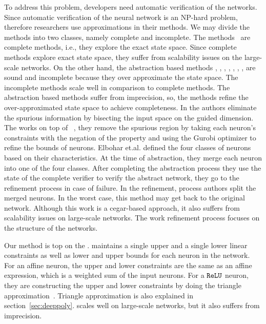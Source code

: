 To address this problem, developers need automatic verification of the networks.
Since automatic verification of the neural network is an NP-hard problem, therefore researchers use approximations in their methods. We may divide the methods into two classes, namely complete and incomplete. The methods~\cite{lomuscio2017approach,fischetti2018deep,dutta2018output,cheng2017maximum,katz2017reluplex,katz2019marabou,ehlers2017formal,huang2017safety,wang2021beta,xu2020fast,zhang2022general} are complete methods, i.e., they explore the exact state space.
Since complete methods explore exact state space, they suffer from scalability issues on the large-scale networks. On the other hand, the abstraction based methods \cite{dvijotham2018dual}, \cite{gehr2018ai2}, \cite{singh2018fast},
 \cite{singh2018boosting}, \cite{weng2018towards}, \cite{wong2018provable}, \cite{zhang2018efficient}, \cite{zhang2018efficient} are sound and incomplete because they over approximate the state space. The incomplete methods scale well in comparison to complete methods.  The abstraction based methods suffer from imprecision, so, the methods \cite{wang2018formal,wang2018efficient,elboher2020abstraction,yang2021improving,lin2020art} refine the over-approximated state space to achieve completeness. In \cite{wang2018formal,wang2018efficient,lin2020art} the authors eliminate the spurious information by bisecting the input space on the guided dimension. The \cite{yang2021improving} works on top of \deeppoly{}~\cite{singh2019abstract}, they remove
the spurious region by taking each neuron's constraints with the negation of the property and using the  Gurobi optimizer \cite{gurobioptimizer} to refine the bounds of neurons. Elbohar et.al. \cite{elboher2020abstraction} defined the four classes of neurons based on their characteristics. At the time of abstraction, they merge each neuron into one of the four classes.  After completing the abstraction process they use the state of the complete verifier to verify  the abstract network, they go to the refinement process in case of failure.   In the refinement, process authors split the merged neurons.  In the worst case, this method may get back to the original network.  Although this work is a cegar-based approach, it also suffers from scalability issues on large-scale networks.   The work \cite{elboher2020abstraction} refinement process focuses on the structure of the networks.

Our method is top on the \deeppoly{}.  \deeppoly{} maintains a single upper and a single lower linear constraints as well as lower and upper bounds
for each neuron in the network. For an affine neuron, the upper and lower constraints are the same as an affine expression,
which is a weighted sum of the input neurons. For a $\mathtt{ReLU}${} neuron, they are constructing the upper and lower constraints
by doing the triangle approximation~\cite{singh2019abstract}. 
Triangle approximation is also explained in section~\ref{sec:deeppoly}. 
\deeppoly{} scales well on large-scale networks, but it also suffers from imprecision. 

